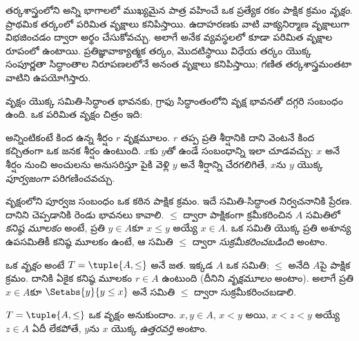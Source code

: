 \documentclass[../../../include/open-logic-section]{subfiles}
\begin{document}

తర్కశాస్త్రంలోని అన్ని భాగాలలో ముఖ్యమైన పాత్ర వహించే ఒక ప్రత్యేక
రకం పాక్షిక క్రమం \emph{వృక్షం}. ప్రాథమిక తర్కంలో పరిమిత వృక్షాలు
కనిపిస్తాయి. ఉదాహరణకు  వాటి వాక్యనిర్మాణ వృక్షాలుగా
విభజించడం ద్వారా అర్థం చేసుకోవచ్చు. అలాగే అనేక 
వ్యవస్థలలో  కూడా పరిమిత వృక్షాల రూపంలో ఉంటాయి.
%
ప్రతిజ్ఞావాక్యాత్మక తర్కం, మొదటిస్థాయి విధేయ తర్కం యొక్క సంపూర్ణతా సిద్ధాంతాల నిరూపణలలోనే
అనంత వృక్షాలు కనిపిస్తాయి; గణిత తర్కశాస్త్రమంతటా వాటిని ఉపయోగిస్తారు.

వృక్షం యొక్క సమితి-సిద్ధాంత భావనకు, గ్రాఫు సిద్ధాంతంలోని వృక్ష భావనతో
దగ్గరి సంబంధం ఉంది. ఒక పరిమిత వృక్షం చిత్రం ఇది:

\begin{center}
\end{center}

అన్నింటికంటే కింద ఉన్న శీర్షం $r$ వృక్షమూలం.
$r$ తప్ప ప్రతి శీర్షానికి దాని వెంటనే కింద కచ్చితంగా ఒక జనక శీర్షం ఉంటుంది.
$x$కు $y$తో ఉండే సంబంధాన్ని ఇలా చూడవచ్చు:
$x$ అనే శీర్షం నుంచి అంచులను అనుసరిస్తూ పైకి వెళ్లి $y$ అనే శీర్షాన్ని
చేరగలిగితే, $x$ను $y$ యొక్క \emph{పూర్వజంగా} పరిగణించవచ్చు.

వృక్షంలోని పూర్వజ సంబంధం ఒక కఠిన పాక్షిక క్రమం.
ఇదే సమితి-సిద్ధాంత నిర్వచనానికి ప్రేరణ.
దానిని చెప్పడానికి రెండు భావనలు కావాలి.
$\le$ ద్వారా పాక్షికంగా క్రమీకరించిన $A$ సమితిలో
\emph{కనిష్ఠ మూలకం} అంటే, ప్రతి $y \in A$కూ $x \le y$
అయ్యే  $x \in A$.
ఒక సమితి యొక్క ప్రతి అశూన్య ఉపసమితికీ కనిష్ఠ మూలకం ఉంటే,
ఆ సమితి $\le$ ద్వారా \emph{సుక్రమీకరించబడింది} అంటాం.

\begin{defn}[వృక్షం]
ఒక \emph{వృక్షం} అంటే $T = \tuple{A, \le}$ అనే జత.
ఇక్కడ $A$ ఒక సమితి; $\le$ అనేది $A$పై పాక్షిక క్రమం.
దానికి ఏకైక కనిష్ఠ మూలకం $r \in A$ ఉంటుంది
(దీనిని \emph{వృక్షమూలం} అంటాం).
అలాగే ప్రతి $x \in A$కూ $\Setabs{y}{y \le x}$ అనే సమితి
$\le$ ద్వారా సుక్రమీకరించబడాలి.
\end{defn}

\begin{defn}[ఉత్తరవర్తులు]
$T = \tuple{A, \le}$ ఒక వృక్షం అనుకుందాం.
$x,y \in A$, $x < y$ అయి, $x < z < y$ అయ్యే $z \in A$
ఏదీ లేకపోతే, $y$ను $x$ యొక్క \emph{ఉత్తరవర్తి} అంటాం.
\end{defn}
\end{document}
